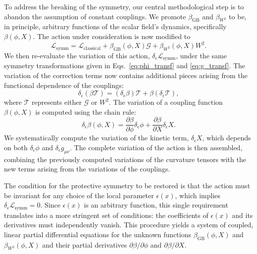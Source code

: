 \documentclass[twocolumn]{aastex631}
\begin{document}
To address the breaking of the symmetry, our central methodological step is to abandon the assumption of constant couplings. We promote $\beta_{\text{GB}}$ and $\beta_{W^2}$ to be, in principle, arbitrary functions of the scalar field's dynamics, specifically $\beta(\phi, X)$. The action under consideration is now modified to
\begin{equation}
\mathcal{L}_{\text{symm}} = \mathcal{L}_{\text{classical}} + \beta_{\text{GB}}(\phi, X) \mathcal{G} + \beta_{W^2}(\phi, X) W^2.
\end{equation}
We then re-evaluate the variation of this action, $\delta_\epsilon \mathcal{L}_{\text{symm}}$, under the same symmetry transformations given in Eqs.~\eqref{eq:phi_transf} and \eqref{eq:g_transf}. The variation of the correction terms now contains additional pieces arising from the functional dependence of the couplings:
\begin{equation}
\delta_\epsilon (\beta \mathcal{T}) = (\delta_\epsilon \beta) \mathcal{T} + \beta (\delta_\epsilon \mathcal{T}),
\end{equation}
where $\mathcal{T}$ represents either $\mathcal{G}$ or $W^2$. The variation of a coupling function $\beta(\phi, X)$ is computed using the chain rule:
\begin{equation}
\delta_\epsilon \beta(\phi, X) = \frac{\partial\beta}{\partial\phi} \delta_\epsilon\phi + \frac{\partial\beta}{\partial X} \delta_\epsilon X.
\end{equation}
We systematically compute the variation of the kinetic term, $\delta_\epsilon X$, which depends on both $\delta_\epsilon \phi$ and $\delta_\epsilon g_{\mu\nu}$. The complete variation of the action is then assembled, combining the previously computed variations of the curvature tensors with the new terms arising from the variations of the couplings.

The condition for the protective symmetry to be restored is that the action must be invariant for any choice of the local parameter $\epsilon(x)$, which implies $\delta_\epsilon \mathcal{L}_{\text{symm}} = 0$. Since $\epsilon(x)$ is an arbitrary function, this single requirement translates into a more stringent set of conditions: the coefficients of $\epsilon(x)$ and its derivatives must independently vanish. This procedure yields a system of coupled, linear partial differential equations for the unknown functions $\beta_{\text{GB}}(\phi, X)$ and $\beta_{W^2}(\phi, X)$ and their partial derivatives $\partial\beta/\partial\phi$ and $\partial\beta/\partial X$.
\end{document}
